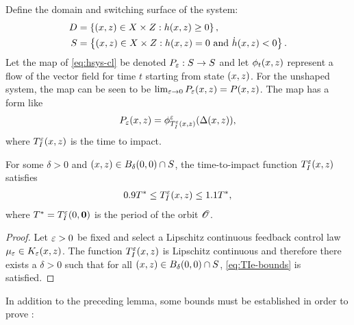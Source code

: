 \documentclass[twocolumn]{article}
\begin{document}
Define the domain and switching surface of the system:
\begin{align}
  D &= \left\{ (x, z) \in X \times Z : h(x, z) \geq 0 \right\},\\
  \nonumber
  S &= \left\{ (x, z) \in X \times Z : h(x, z) = 0 \mbox{ and } {\dot h}(x, z) < 0 \right\}.
\end{align}
Let the \Poincare{} map of \eqref{eq:hsys-cl} be denoted $P_{\varepsilon} : S \to S$ and let $\phi_{t}(x, z)$ represent a flow of the vector field for time $t$ starting from state $(x, z)$.
%
For the unshaped system, the \Poincare{} map can be seen to be $\lim_{\varepsilon \to 0} P_{\varepsilon}(x, z) = P(x, z)$.
%
The \Poincare{} map has a form like
\begin{align}
  P_{\varepsilon}(x, z) = \phi^{\varepsilon}_{T_{I}^{\varepsilon}(x, z)}(\Delta(x, z)),
\end{align}
where $T_{I}^{\varepsilon}(x, z)$ is the time to impact.

\begin{lemma}
  \label{lemma:TIe-bounds}
  For some $\delta > 0$ and $(x, z) \in B_{\delta}(0, 0) \cap S$, the time-to-impact function $T_{I}^{\varepsilon}(x, z)$ satisfies
  \begin{align}
    \label{eq:TIe-bounds}
    0.9 T^{*} \leq T_{I}^{\varepsilon}(x, z) \leq 1.1 T^{*},
  \end{align}
  where $T^{*} = T_{I}^{\varepsilon}(0, {\mathbf 0})$ is the period of the orbit ${\mathscr O}$.
\end{lemma}
\begin{proof}
  Let $\varepsilon > 0$ be fixed and select a Lipschitz continuous feedback control law $\mu_{\varepsilon} \in K_{\varepsilon}(x, z)$. The function $T_{I}^{\varepsilon}(x, z)$ is Lipschitz continuous and therefore there exists a $\delta > 0$ such that for all $(x, z) \in B_{\delta}(0, 0) \cap S$, \eqref{eq:TIe-bounds} is satisfied.
\end{proof}

In addition to the preceding lemma, some bounds must be established in order to prove :
\end{document}
